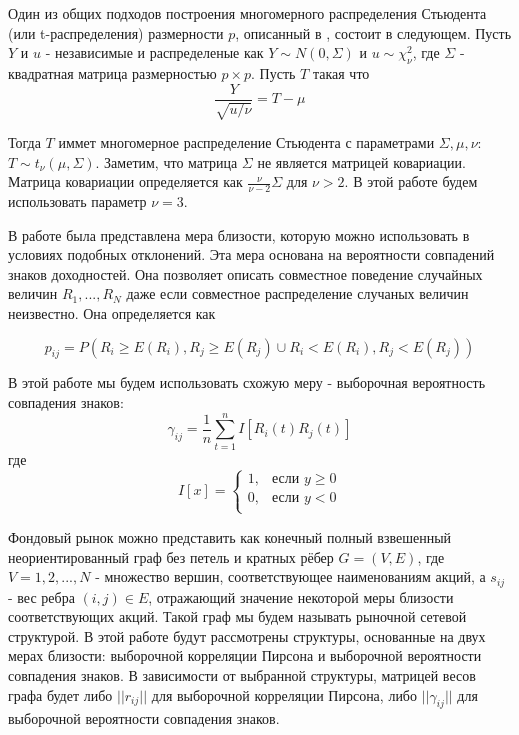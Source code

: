 Один из общих подходов построения многомерного распределения Стьюдента (или t-распределения) размерности $p$, описанный в \cite{t-distrib}, состоит в следующем. Пусть $Y$ и $u$ - независимые и распределеные как $Y \sim N(0, \Sigma)$ и $u\sim\chi_\nu^2$, где $\Sigma$ - квадратная матрица размерностью $p \times p$. Пусть $T$ такая что
\begin{equation}
  \frac{Y}{\sqrt{u/\nu}} = T - \mu 
  \label{eq:student}
\end{equation}

Тогда $T$ иммет многомерное распределение Стьюдента с параметрами $\Sigma, \mu, \nu$:  $T \sim t_\nu(\mu, \Sigma)$. Заметим, что матрица $\Sigma$ не является матрицей ковариации. Матрица ковариации определяется как $\frac{\nu}{\nu-2}\Sigma$ для $\nu > 2$. В этой работе будем использовать параметр $\nu = 3$.
	
	
В работе \cite{signs} была представлена мера близости, которую можно использовать  в условиях подобных отклонений. Эта мера основана на вероятности совпадений знаков доходностей. Она позволяет описать совместное поведение случайных величин $R_1, ..., R_N$ даже если совместное распределение случаных величин неизвестно. Она определяется как

\begin{equation}
	p_{i j} = P(R_i \geq E(R_i), R_j \geq E(R_j) \cup R_i < E(R_i), R_j < E(R_j))
\end{equation}

В этой работе мы будем использовать схожую меру - выборочная вероятность совпадения знаков:
\begin{equation}
	\gamma_{i j} = \frac{1}{n}\sum_{t=1}^{n}I[R_i(t)R_j(t)]
\end{equation}
где 
\begin{equation*}
  I[x] =
    \begin{cases}
      1, & \text{если $y \geq 0 $}\\
      0, & \text{если $y < 0 $}\\
    \end{cases}       
\end{equation*}


Фондовый рынок можно представить как конечный полный взвешенный неориентированный граф без петель и кратных рёбер $G=(V,E)$, где $V={1,2,...,N}$  - множество вершин, соответствующее наименованиям акций, а $s_{i j}$ - вес ребра $(i,j) \in E$, отражающий значение некоторой меры близости соответствующих акций. Такой граф мы будем называть рыночной сетевой структурой. В этой работе будут рассмотрены структуры, основанные на двух мерах близости: выборочной корреляции Пирсона и выборочной вероятности совпадения знаков.  В зависимости от выбранной структуры, матрицей весов графа будет либо $||r_{i j}||$  для выборочной корреляции Пирсона, либо $||\gamma_{i j}||$  для выборочной вероятности совпадения знаков.


